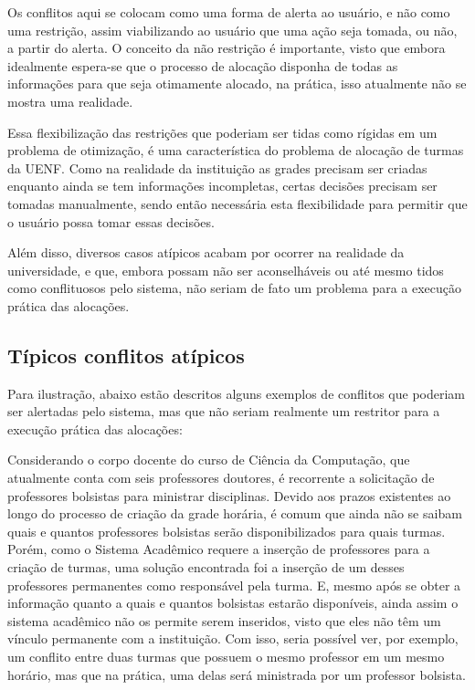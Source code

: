 Os conflitos aqui se colocam como uma forma de alerta ao usuário, e não como uma restrição, assim viabilizando ao usuário que uma ação seja tomada, ou não, a partir do alerta. O conceito da não restrição é importante, visto que embora idealmente espera-se que o processo de alocação disponha de todas as informações para que seja otimamente alocado, na prática, isso atualmente não se mostra uma realidade.

Essa flexibilização das restrições que poderiam ser tidas como rígidas em um problema de otimização, é uma característica do problema de alocação de turmas da UENF. Como na realidade da instituição as grades precisam ser criadas enquanto ainda se tem informações incompletas, certas decisões precisam ser tomadas manualmente, sendo então necessária esta flexibilidade para permitir que o usuário possa tomar essas decisões.

Além disso, diversos casos atípicos acabam por ocorrer na realidade da universidade, e que, embora possam não ser aconselháveis ou até mesmo tidos como conflituosos pelo sistema, não seriam de fato um problema para a execução prática das alocações.

\subsection{Típicos conflitos atípicos}

Para ilustração, abaixo estão descritos alguns exemplos de conflitos que poderiam ser alertadas pelo sistema, mas que não seriam realmente um restritor para a execução prática das alocações:

Considerando o corpo docente do curso de Ciência da Computação, que atualmente conta com seis professores doutores, é recorrente a solicitação de professores bolsistas para ministrar disciplinas. Devido aos prazos existentes ao longo do processo de criação da grade horária, é comum que ainda não se saibam quais e quantos professores bolsistas serão disponibilizados para quais turmas. Porém, como o Sistema Acadêmico requere a inserção de professores para a criação de turmas, uma solução encontrada foi a inserção de um desses professores permanentes como responsável pela turma. E, mesmo após se obter a informação quanto a quais e quantos bolsistas estarão disponíveis, ainda assim o sistema acadêmico não os permite serem inseridos, visto que eles não têm um vínculo permanente com a instituição. Com isso, seria possível ver, por exemplo, um conflito entre duas turmas que possuem o mesmo professor em um mesmo horário, mas que na prática, uma delas será ministrada por um professor bolsista.

